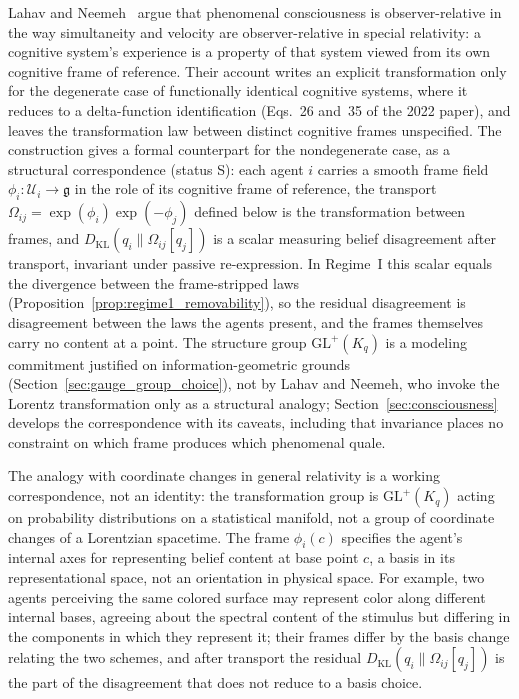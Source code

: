 Lahav and Neemeh~\cite{LahavNeemeh2022, LahavNeemeh2025} argue that phenomenal consciousness is observer-relative in the way simultaneity and velocity are observer-relative in special relativity: a cognitive system's experience is a property of that system viewed from its own cognitive frame of reference. Their account writes an explicit transformation only for the degenerate case of functionally identical cognitive systems, where it reduces to a delta-function identification (Eqs.~26 and~35 of the 2022 paper), and leaves the transformation law between distinct cognitive frames unspecified. The construction gives a formal counterpart for the nondegenerate case, as a structural correspondence (status S): each agent $i$ carries a smooth frame field $\phi_i: \mathcal{U}_i \to \mathfrak{g}$ in the role of its cognitive frame of reference, the transport $\Omega_{ij} = \exp(\phi_i)\exp(-\phi_j)$ defined below is the transformation between frames, and $D_{\mathrm{KL}}(q_i \| \Omega_{ij}[q_j])$ is a scalar measuring belief disagreement after transport, invariant under passive re-expression. In Regime~I this scalar equals the divergence between the frame-stripped laws (Proposition~\ref{prop:regime1_removability}), so the residual disagreement is disagreement between the laws the agents present, and the frames themselves carry no content at a point. The structure group $\mathrm{GL}^+(K_q)$ is a modeling commitment justified on information-geometric grounds (Section~\ref{sec:gauge_group_choice}), not by Lahav and Neemeh, who invoke the Lorentz transformation only as a structural analogy; Section~\ref{sec:consciousness} develops the correspondence with its caveats, including that invariance places no constraint on which frame produces which phenomenal quale.

The analogy with coordinate changes in general relativity is a working correspondence, not an identity: the transformation group is $\mathrm{GL}^+(K_q)$ acting on probability distributions on a statistical manifold, not a group of coordinate changes of a Lorentzian spacetime. The frame $\phi_i(c)$ specifies the agent's internal axes for representing belief content at base point $c$, a basis in its representational space, not an orientation in physical space. For example, two agents perceiving the same colored surface may represent color along different internal bases, agreeing about the spectral content of the stimulus but differing in the components in which they represent it; their frames differ by the basis change relating the two schemes, and after transport the residual $D_{\mathrm{KL}}(q_i \| \Omega_{ij}[q_j])$ is the part of the disagreement that does not reduce to a basis choice.

